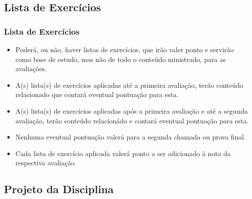 \subsection[Lista de Exercícios]{Lista de Exercícios}\label{subsec:sec03-lista-exercicios}



\begin{frame}[t]\frametitle{Lista de Exercícios}

  \begin{itemize}
    \justifying{}
    \setlength\itemsep{1em}
    \item Poderá, ou não, haver listas de exercícios, que irão valer ponto e servirão como base de estudo, mas não de todo o conteúdo ministrado, para as avaliações.
    \item A(s) lista(s) de exercícios aplicadas até a primeira avaliação, terão conteúdo relacionado que contará eventual pontuação para esta.
    \item A(s) lista(s) de exercícios aplicadas após a primeira avaliação e até a segunda avaliação, terão conteúdo relacionádo e contará eventual pontuação para esta.
    \item Nenhuma eventual pontuação valerá para a segunda chamada ou prova final.
    \item Cada lista de exercício aplicada valerá ponto a ser adicionado à nota da respectiva avaliação.
  \end{itemize}

\end{frame}



\subsection[Projeto da Disciplina]{Projeto da Disciplina}\label{subsec:sec03-projeto-disciplina}



